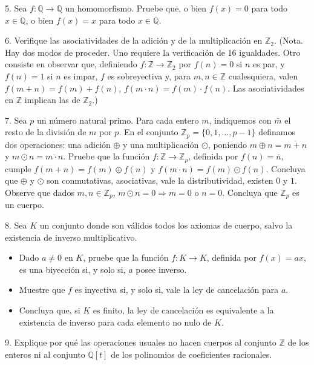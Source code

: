\documentclass[12pt,oneside]{book}
\begin{document}
5. Sea \( f: \mathbb{Q} \to \mathbb{Q} \) un homomorfismo. Pruebe que, o bien \( f(x) = 0 \) para todo \( x \in \mathbb{Q} \), o bien \( f(x) = x \) para todo \( x \in \mathbb{Q} \).

6. Verifique las asociatividades de la adición y de la multiplicación en \( \mathbb{Z}_2 \). (Nota. Hay dos modos de proceder. Uno requiere la verificación de 16 igualdades. Otro consiste en observar que, definiendo \( f: \mathbb{Z} \to \mathbb{Z}_2 \) por \( f(n) = 0 \) si \( n \) es par, y \( f(n) = 1 \) si \( n \) es impar, \( f \) es sobreyectiva y, para \( m, n \in \mathbb{Z} \) cualesquiera, valen \( f(m + n) = f(m) + f(n) \), \( f(m \cdot n) = f(m) \cdot f(n) \). Las asociatividades en \( \mathbb{Z} \) implican las de \( \mathbb{Z}_2 \).)

7. Sea \( p \) un número natural primo. Para cada entero \( m \), indiquemos con \( \bar{m} \) el resto de la división de \( m \) por \( p \). En el conjunto \( \mathbb{Z}_p = \{0, 1, \dots, p-1\} \) definamos dos operaciones: una adición \( \oplus \) y una multiplicación \( \odot \), poniendo \( m \oplus n = \overline{m + n} \) y \( m \odot n = \overline{m \cdot n} \). Pruebe que la función \( f: \mathbb{Z} \to \mathbb{Z}_p \), definida por \( f(n) = \bar{n} \), cumple \( f(m + n) = f(m) \oplus f(n) \) y \( f(m \cdot n) = f(m) \odot f(n) \). Concluya que \( \oplus \) y \( \odot \) son conmutativas, asociativas, vale la distributividad, existen \( 0 \) y \( 1 \). Observe que dados \( m, n \in \mathbb{Z}_p \), \( m \odot n = 0 \Rightarrow m = 0 \) o \( n = 0 \). Concluya que \( \mathbb{Z}_p \) es un cuerpo.

8. Sea \( K \) un conjunto donde son válidos todos los axiomas de cuerpo, salvo la existencia de inverso multiplicativo.

\begin{itemize}
    \item [i)] Dado \( a \neq 0 \) en \( K \), pruebe que la función \( f: K \to K \), definida por \( f(x) = ax \), es una biyección si, y solo si, \( a \) posee inverso.
    \item [ii)] Muestre que \( f \) es inyectiva si, y solo si, vale la ley de cancelación para \( a \).
    \item [iii)] Concluya que, si \( K \) es finito, la ley de cancelación es equivalente a la existencia de inverso para cada elemento no nulo de \( K \).
\end{itemize}

9. Explique por qué las operaciones usuales no hacen cuerpos al conjunto \( \mathbb{Z} \) de los enteros ni al conjunto \( \mathbb{Q}[t] \) de los polinomios de coeficientes racionales.
\end{document}
